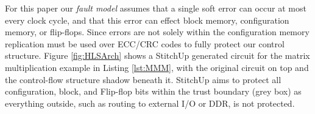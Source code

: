 For this paper our \emph{fault model} assumes that a single soft error
can occur at most every clock cycle, and that this error can effect block memory,
configuration memory, or flip-flops.
Since errors are not solely within the configuration memory replication must be used
over ECC/CRC codes to fully protect our control structure.
Figure \ref{fig:HLSArch} shows a StitchUp generated circuit for the matrix multiplication
example in Listing \ref{lst:MMM}, with the original circuit on top and the
control-flow structure shadow beneath it.
StitchUp aims to protect all configuration, block, and Flip-flop bits within the
trust boundary (grey box) as everything outside, such as routing to
external I/O or DDR, is not protected.


%
%
%
%

